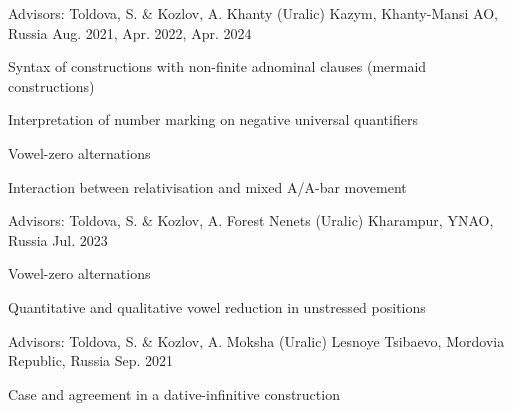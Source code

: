 \begin{cventries}

  \cventry
    {Advisors: Toldova, S. \& Kozlov, A.} %
    {Khanty (Uralic)} %
    {Kazym, Khanty-Mansi AO, Russia} %
    {Aug. 2021, Apr. 2022, Apr. 2024} %
    {
      \begin{cvitems} %
        \item {Syntax of constructions with non-finite adnominal clauses (mermaid constructions)}
        \item {Interpretation of number marking on negative universal quantifiers}
        \item {Vowel-zero alternations}
        \item {Interaction between relativisation and mixed A/A-bar movement}
      \end{cvitems}
    }

  \cventry
    {Advisors: Toldova, S. \& Kozlov, A.} %
    {Forest Nenets (Uralic)} %
    {Kharampur, YNAO, Russia} %
    {Jul. 2023} %
    {
      \begin{cvitems} %
        \item {Vowel-zero alternations}
        \item {Quantitative and qualitative vowel reduction in unstressed positions}
      \end{cvitems}
    }

  \cventry
    {Advisors: Toldova, S. \& Kozlov, A.} %
    {Moksha (Uralic)} %
    {Lesnoye Tsibaevo, Mordovia Republic, Russia} %
    {Sep. 2021} %
    {
      \begin{cvitems} %
        \item {Case and agreement in a dative-infinitive construction}
      \end{cvitems}
    }
\end{cventries}
